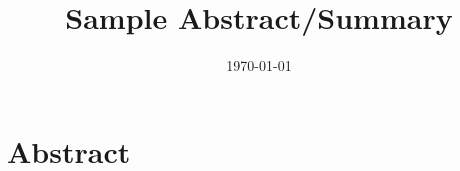 \documentclass[12pt, a4paper]{article}
\title{Sample Abstract/Summary}
\author{}
\date{\today}
\begin{document}
	
	\maketitle
	
	\section*{Abstract}
	\lipsum[1]
	
	\vspace{0.5cm}
	
    \lipsum[3]
	
\end{document}
